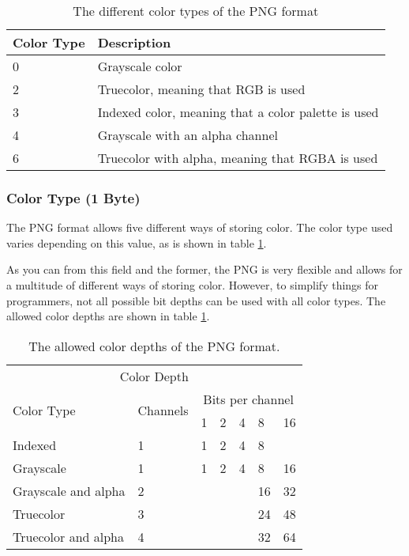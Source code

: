 \begin{table}
  \centering
  \begin{tabular}{l l}
    \toprule
    Color Type & Description \\
    \midrule
    0 & Grayscale color \\
    2 & Truecolor, meaning that RGB is used \\
    3 & Indexed color, meaning that a color palette is used \\
    4 & Grayscale with an alpha channel \\
    6 & Truecolor with alpha, meaning that RGBA is used \\
    \bottomrule
  \end{tabular}
  \caption{The different color types of the PNG format}
  \label{tab:png-color-type}
\end{table}

\subsubsection*{Color Type (1 Byte)}

The PNG format allows five different ways of storing color. The color
type used varies depending on this value, as is shown in table
\ref{tab:png-color-type}.

As you can from this field and the former, the PNG is very flexible
and allows for a multitude of different ways of storing
color. However, to simplify things for programmers, not all possible
bit depths can be used with all color types. The allowed color depths
are shown in table \ref{tab:png-color-type}.

\begin{table}
  \centering

  \newcommand{\invalid}{\cellcolor{gray}}

  \begin{tabular}{|l|l|l|l|l|l|l|}
    \hline
    \multicolumn{7}{|c|}{Color Depth} \\
    \cline{1-7}
    \multirow{2}{*}{Color Type} & \multirow{2}{*}{Channels} &
    \multicolumn{5}{c|}{Bits per channel} \\

    \cline{3-7}

    & & 1 & 2 & 4 & 8 & 16 \\

    \hline
    Indexed & 1 & 1 & 2 & 4 & 8 & \invalid \\ \hline
    Grayscale & 1 & 1 & 2 & 4 & 8 & 16  \\ \hline
    Grayscale and alpha & 2 & \invalid& \invalid & \invalid & 16 & 32  \\ \hline
    Truecolor & 3 & \invalid & \invalid & \invalid & 24 & 48  \\ \hline
    Truecolor and alpha & 4 & \invalid & \invalid & \invalid & 32 & 64  \\ \hline

    \hline

  \end{tabular}
  \caption{The allowed color depths of the PNG format.}
  \label{tab:png-color-depths}
\end{table}

